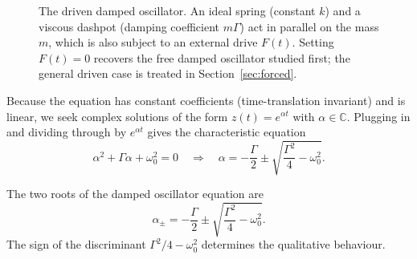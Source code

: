 \begin{figure}[ht]
\centering
{}
\caption{The driven damped oscillator. An ideal spring (constant $k$) and a viscous dashpot (damping coefficient $m\Gamma$) act in parallel on the mass $m$, which is also subject to an external drive $F(t)$. Setting $F(t)=0$ recovers the free damped oscillator studied first; the general driven case is treated in Section~\ref{sec:forced}.}
\label{fig:driven-schematic}
\end{figure}

Because the equation has constant coefficients (time-translation invariant) and is linear, we seek complex solutions of the form $z(t) = e^{\alpha t}$ with $\alpha \in \mathbb{C}$. Plugging in and dividing through by $e^{\alpha t}$ gives the characteristic equation
\begin{equation}
    \alpha^2 + \Gamma\alpha + \omega_0^2 = 0
    \quad\Longrightarrow\quad
    \alpha = -\frac{\Gamma}{2} \pm \sqrt{\frac{\Gamma^2}{4} - \omega_0^2}.
\end{equation}

\begin{fact}
The two roots of the damped oscillator equation are
\begin{equation}
    \alpha_\pm = -\frac{\Gamma}{2} \pm \sqrt{\frac{\Gamma^2}{4} - \omega_0^2}.
\end{equation}
The sign of the discriminant $\Gamma^2/4 - \omega_0^2$ determines the qualitative behaviour.
\end{fact}

